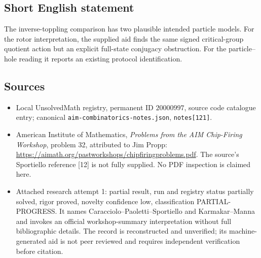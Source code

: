 \documentclass[11pt]{article}
\begin{document}
\subsection{Short English statement}
The inverse-toppling comparison has two plausible intended particle models. For the rotor interpretation, the supplied aid finds the same signed critical-group quotient action but an explicit full-state conjugacy obstruction. For the particle--hole reading it reports an existing protocol identification.
\subsection{Sources}
\begin{itemize}
\item Local UnsolvedMath registry, permanent ID $20000997$, source code catalogue entry; canonical \texttt{aim-combinatorics-notes.json}, \texttt{notes[121]}.
\item American Institute of Mathematics, \emph{Problems from the AIM Chip-Firing Workshop}, problem 32, attributed to Jim Propp: \url{https://aimath.org/pastworkshops/chipfiringproblems.pdf}. The source's Sportiello reference [12] is not fully supplied. No PDF inspection is claimed here.
\item Attached research attempt 1: partial result, run and registry status partially solved, rigor proved, novelty confidence low, classification PARTIAL-PROGRESS. It names Caracciolo--Paoletti--Sportiello and Karmakar--Manna and invokes an official workshop-summary interpretation without full bibliographic details. The record is reconstructed and unverified; its machine-generated aid is not peer reviewed and requires independent verification before citation.
\end{itemize}
\end{document}
